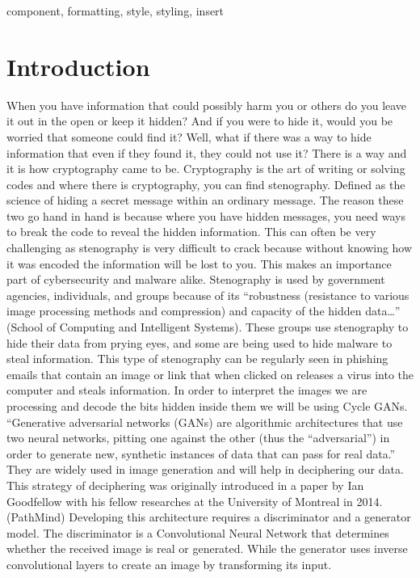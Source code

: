 \documentclass[conference]{IEEEtran}
\begin{document}

\begin{IEEEkeywords}
component, formatting, style, styling, insert
\end{IEEEkeywords}

\section{Introduction}

When you have information that could possibly harm you or others do you leave it out in the open or keep it hidden? And if you were to hide it, would you be worried that someone could find it? Well, what if there was a way to hide information that even if they found it, they could not use it? There is a way and it is how cryptography came to be. Cryptography is the art of writing or solving codes and where there is cryptography, you can find stenography. Defined as the science of hiding a secret message within an ordinary message. The reason these two go hand in hand is because where you have hidden messages, you need ways to break the code to reveal the hidden information.
This can often be very challenging as stenography is very difficult to crack because without knowing how it was encoded the information will be lost to you. This makes an importance part of cybersecurity and malware alike. Stenography is used by government agencies, individuals, and groups because of its “robustness (resistance to various image processing methods and compression) and capacity of the hidden data…” (School of Computing and Intelligent Systems).
These groups use stenography to hide their data from prying eyes, and some are being used to hide malware to steal information. This type of stenography can be regularly seen in phishing emails that contain an image or link that when clicked on releases a virus into the computer and steals information.
In order to interpret the images we are processing and decode the bits hidden inside them we will be using Cycle GANs. “Generative adversarial networks (GANs) are algorithmic architectures that use two neural networks, pitting one against the other (thus the “adversarial”) in order to generate new, synthetic instances of data that can pass for real data.” They are widely used in image generation and will help in deciphering our data. This strategy of deciphering was originally introduced in a paper by Ian Goodfellow with his fellow researches at the University of Montreal in 2014. (PathMind)
Developing this architecture requires a discriminator and a generator model. The discriminator is a Convolutional Neural Network that determines whether the received image is real or generated. While the generator uses inverse convolutional layers to create an image by transforming its input.
\end{document}
